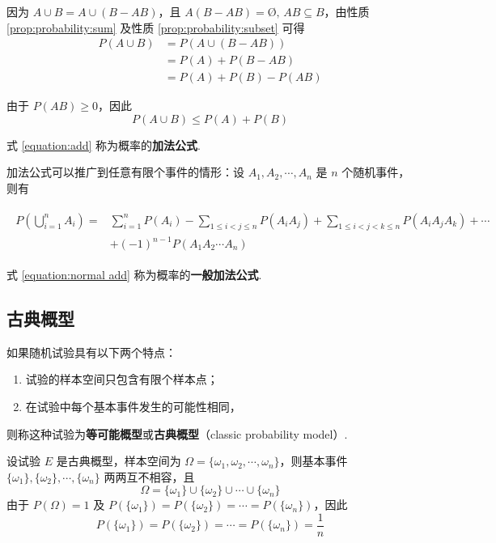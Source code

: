 \begin{myproof}
    因为 $A \cup B = A \cup (B-AB)$，且 $A(B-AB)=\text{\O},\, AB \subseteq B$，由性质 \ref*{prop:probability:sum} 及性质 \ref*{prop:probability:subset} 可得
    $$
    \begin{aligned}
        P(A \cup B) &= P(A \cup (B-AB))\\
        &= P(A) + P(B-AB)\\
        &= P(A) + P(B) - P(AB)
    \end{aligned}
    $$

    由于 $P(AB)\geqslant 0$，因此
    $$
    P(A \cup B) \leqslant P(A) + P(B)
    $$
\end{myproof}

式 \eqref{equation:add} 称为概率的\textbf{加法公式}.

加法公式可以推广到任意有限个事件的情形：设 $A_1,A_2,\cdots,A_n$ 是 $n$ 个随机事件，则有

\begin{align} \label{equation:normal add}
    \begin{split}
        P(\bigcup_{i=1}^n A_i) = & \sum_{i=1}^n P(A_i) - \sum_{1 \leqslant i<j \leqslant n} P(A_i A_j) + \sum_{1 \leqslant i<j<k \leqslant n} P(A_i A_j A_k) + \cdots\\
        & + (-1)^{n-1} P(A_1 A_2 \cdots A_n)
    \end{split}
\end{align}

式 \eqref{equation:normal add} 称为概率的\textbf{一般加法公式}.

\subsection{古典概型}

如果随机试验具有以下两个特点：
\begin{enumerate}
    \item 试验的样本空间只包含有限个样本点；
    \item 在试验中每个基本事件发生的可能性相同，
\end{enumerate}
则称这种试验为\textbf{等可能概型}或\textbf{古典概型}（classic probability model）.

设试验 $E$ 是古典概型，样本空间为 $\varOmega=\{\omega_1,\omega_2,\cdots,\omega_n\}$，则基本事件 $\{\omega_1\},\{\omega_2\},\cdots,\{\omega_n\}$ 两两互不相容，且
$$
\varOmega = \{\omega_1\} \cup \{\omega_2\} \cup \cdots \cup \{\omega_n\}
$$
由于 $P(\varOmega)=1$ 及 $P(\{\omega_1\})=P(\{\omega_2\})=\cdots=P(\{\omega_n\})$，因此
$$
P(\{\omega_1\})=P(\{\omega_2\})=\cdots=P(\{\omega_n\})=\dfrac{1}{n}
$$

